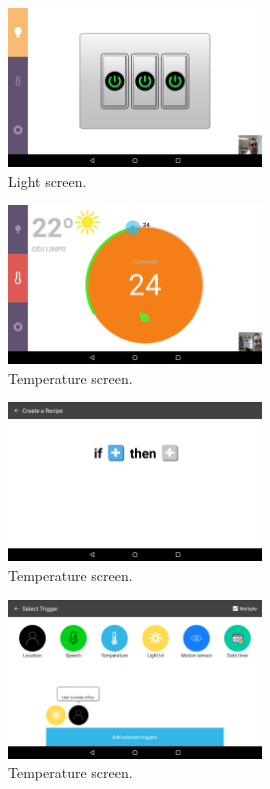 %


\begin{figure}[H]
\centering
\includegraphics[width=0.6\textwidth]{Figures/screen_lights}
\caption{Light screen.}
\label{screen_lights}
\end{figure}


\begin{figure}[H]
\centering
\includegraphics[width=0.6\textwidth]{Figures/screen_temperature}
\caption{Temperature screen.}
\label{screen_temperature}
\end{figure}



\begin{figure}[H]
\centering
\includegraphics[width=0.6\textwidth]{Figures/create_recipe}
\caption{Temperature screen.}
\label{create_recipe}
\end{figure}

\begin{figure}[H]
\centering
\includegraphics[width=0.6\textwidth]{Figures/screen_trigger}
\caption{Temperature screen.}
\label{screen_triggers}
\end{figure}


